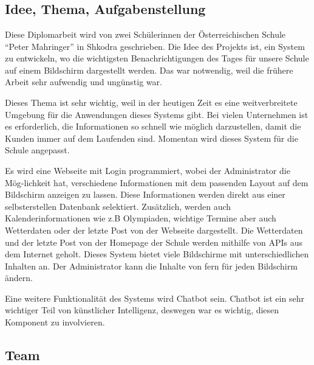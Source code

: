 \chapter{\docname}
\label{\docname}

\section{Idee, Thema, Aufgabenstellung}
Diese Diplomarbeit wird von zwei Sch\"{u}lerinnen der \"{O}sterreichischen Schule \textquotedblleft{}Peter Mahringer\textquotedblright{} in Shkodra geschrieben. Die Idee des Projekts ist, ein System zu entwickeln, wo die wichtigsten Benachrichtigungen des Tages f\"{u}r unsere Schule auf einem Bildschirm dargestellt werden. Das war notwendig, weil die fr\"{u}here Arbeit sehr aufwendig und ung\"{u}nstig war.  

Dieses Thema ist sehr wichtig, weil in der heutigen Zeit es eine weitverbreitete Umgebung f\"{u}r die Anwendungen dieses Systems gibt. Bei vielen Unternehmen ist es erforderlich, die Informationen so schnell wie m\"{o}glich darzustellen, damit die Kunden immer auf dem Laufenden sind. Momentan wird dieses System f\"{u}r die Schule angepasst.  

Es wird eine Webseite mit Login programmiert, wobei der Administrator die M\"og-lichkeit hat, verschiedene Informationen mit dem passenden Layout auf dem Bildschirm anzeigen zu lassen. Diese Informationen werden direkt aus einer selbsterstellen Datenbank selektiert. Zus\"{a}tzlich, werden auch Kalenderinformationen wie z.B Olympiaden, wichtige Termine aber auch Wetterdaten oder der letzte Post von der Webseite dargestellt. Die Wetterdaten und der letzte Post von der Homepage der Schule werden mithilfe von APIs aus dem Internet geholt.  
Dieses System bietet viele Bildschirme mit unterschiedlichen Inhalten an. Der Administrator kann die Inhalte von fern f\"{u}r jeden Bildschirm \"{a}ndern. 

Eine weitere Funktionalit\"{a}t des Systems wird Chatbot sein. Chatbot ist ein sehr wichtiger Teil von k\"{u}nstlicher Intelligenz, deswegen war es wichtig, diesen Komponent zu involvieren. 


\section{Team}

